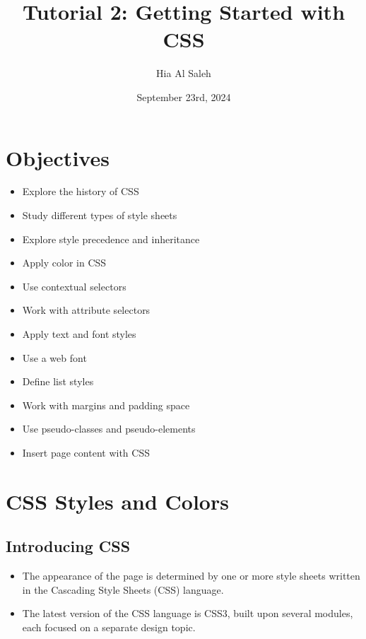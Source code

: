 \documentclass{article}
\title{Tutorial 2: Getting Started with CSS}
\author{Hia Al Saleh}
\date{September 23rd, 2024}
\begin{document}
\maketitle
\tableofcontents
\newpage 
\section*{Objectives}
\begin{itemize}
    \item Explore the history of CSS
    \item Study different types of style sheets
    \item Explore style precedence and inheritance
    \item Apply color in CSS
    \item Use contextual selectors
    \item Work with attribute selectors
    \item Apply text and font styles
    \item Use a web font
    \item Define list styles
    \item Work with margins and padding space
    \item Use pseudo-classes and pseudo-elements
    \item Insert page content with CSS
\end{itemize}

\section{CSS Styles and Colors}
\subsection{Introducing CSS}
\begin{itemize}
    \item The appearance of the page is determined by one or more style sheets written in the Cascading Style Sheets (CSS) language.
    \item The latest version of the CSS language is CSS3, built upon several modules, each focused on a separate design topic.
\end{itemize}
\end{document}

